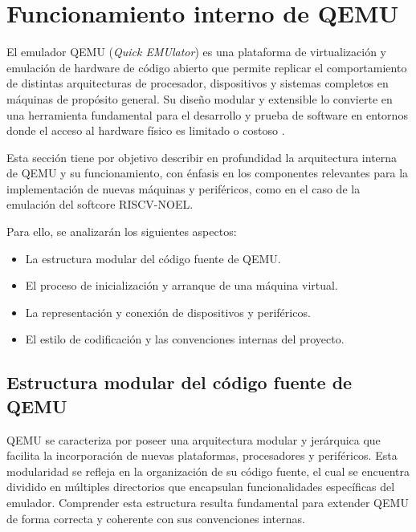 \section{Funcionamiento interno de QEMU}
\label{sec:funcionamiento-qemu}

El emulador QEMU (\textit{Quick EMUlator}) es una plataforma de virtualización y emulación de hardware de código abierto que permite replicar el comportamiento de distintas arquitecturas de procesador, dispositivos y sistemas completos en máquinas de propósito general. Su diseño modular y extensible lo convierte en una herramienta fundamental para el desarrollo y prueba de software en entornos donde el acceso al hardware físico es limitado o costoso \cite{qemu_docs_master, redhat_qemu_internals}.

Esta sección tiene por objetivo describir en profundidad la arquitectura interna de QEMU y su funcionamiento, con énfasis en los componentes relevantes para la implementación de nuevas máquinas y periféricos, como en el caso de la emulación del softcore RISCV-NOEL.

Para ello, se analizarán los siguientes aspectos:

\begin{itemize}
  \item La estructura modular del código fuente de QEMU.
  \item El proceso de inicialización y arranque de una máquina virtual.
  \item La representación y conexión de dispositivos y periféricos.
  \item El estilo de codificación y las convenciones internas del proyecto.
\end{itemize}

\subsection{Estructura modular del código fuente de QEMU}
\label{subsec:estructura-modular-qemu}

QEMU se caracteriza por poseer una arquitectura modular y jerárquica que facilita la incorporación de nuevas plataformas, procesadores y periféricos. Esta modularidad se refleja en la organización de su código fuente, el cual se encuentra dividido en múltiples directorios que encapsulan funcionalidades específicas del emulador. Comprender esta estructura resulta fundamental para extender QEMU de forma correcta y coherente con sus convenciones internas.

